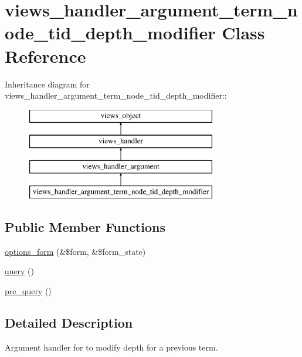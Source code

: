\hypertarget{classviews__handler__argument__term__node__tid__depth__modifier}{
\section{views\_\-handler\_\-argument\_\-term\_\-node\_\-tid\_\-depth\_\-modifier Class Reference}
\label{classviews__handler__argument__term__node__tid__depth__modifier}
}
Inheritance diagram for views\_\-handler\_\-argument\_\-term\_\-node\_\-tid\_\-depth\_\-modifier::\begin{figure}[H]
\begin{center}
\leavevmode
\includegraphics[height=4cm]{classviews__handler__argument__term__node__tid__depth__modifier}
\end{center}
\end{figure}
\subsection*{Public Member Functions}
\begin{CompactItemize}
\item 
\hyperlink{classviews__handler__argument__term__node__tid__depth__modifier_a4796e763923377f41dbf9bf415d96e8}{options\_\-form} (\&\$form, \&\$form\_\-state)
\item 
\hyperlink{classviews__handler__argument__term__node__tid__depth__modifier_13fb3ff5466a1c9fcd863bb4962a18c8}{query} ()
\item 
\hyperlink{classviews__handler__argument__term__node__tid__depth__modifier_278abcb2e424241efa1361d01be89eb1}{pre\_\-query} ()
\end{CompactItemize}


\subsection{Detailed Description}
Argument handler for to modify depth for a previous term.

